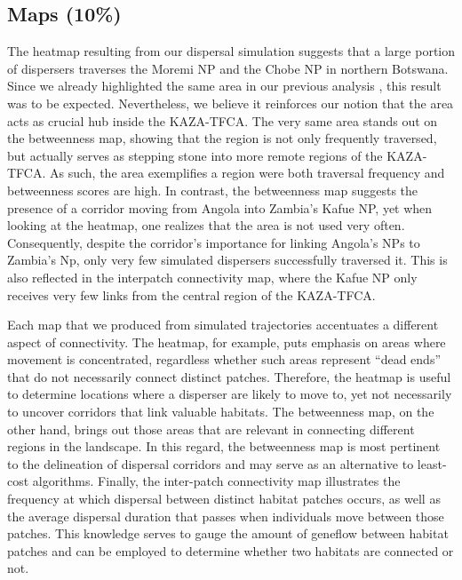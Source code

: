 \documentclass[abstract=on,10pt,a4paper,bibliography=totocnumbered]{article}
\begin{document}
\subsection{Maps (10\%)}
The heatmap resulting from our dispersal simulation suggests that a large
portion of dispersers traverses the Moremi NP and the Chobe NP in northern
Botswana. Since we already highlighted the same area in our previous analysis
\citep{Hofmann.2021}, this result was to be expected. Nevertheless, we believe
it reinforces our notion that the area acts as crucial hub inside the KAZA-TFCA.
The very same area stands out on the betweenness map, showing that the region is
not only frequently traversed, but actually serves as stepping stone into more
remote regions of the KAZA-TFCA. As such, the area exemplifies a region were
both traversal frequency and betweenness scores are high. In contrast, the
betweenness map suggests the presence of a corridor moving from Angola into
Zambia's Kafue NP, yet when looking at the heatmap, one realizes that the area
is not used very often. Consequently, despite the corridor's importance for
linking Angola's NPs to Zambia's Np, only very few simulated dispersers
successfully traversed it. This is also reflected in the interpatch connectivity
map, where the Kafue NP only receives very few links from the central region of
the KAZA-TFCA.

Each map that we produced from simulated trajectories accentuates a different
aspect of connectivity. The heatmap, for example, puts emphasis on areas where
movement is concentrated, regardless whether such areas represent ``dead ends''
that do not necessarily connect distinct patches. Therefore, the heatmap is
useful to determine locations where a disperser are likely to move to, yet not
necessarily to uncover corridors that link valuable habitats. The betweenness
map, on the other hand, brings out those areas that are relevant in connecting
different regions in the landscape. In this regard, the betweenness map is most
pertinent to the delineation of dispersal corridors and may serve as an
alternative to least-cost algorithms. Finally, the inter-patch connectivity map
illustrates the frequency at which dispersal between distinct habitat patches
occurs, as well as the average dispersal duration that passes when individuals
move between those patches. This knowledge serves to gauge the amount of
geneflow between habitat patches and can be employed to determine whether two
habitats are connected or not.
\end{document}

